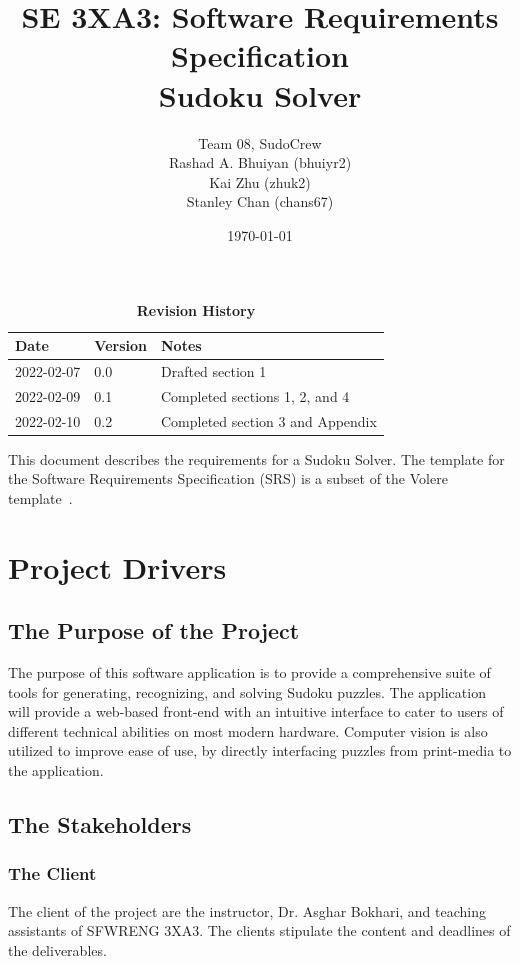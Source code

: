 \documentclass[11pt]{article}
\title{SE 3XA3: Software Requirements Specification\\Sudoku Solver}
\author{Team 08, SudoCrew
		\\ Rashad A. Bhuiyan (bhuiyr2)
		\\ Kai Zhu (zhuk2)
		\\ Stanley Chan (chans67)
}
\date{\today}
\begin{document}
\maketitle

\tableofcontents
\newpage
\listoftables
\listoffigures

\newpage

\begin{table}[H]
\caption{\bf Revision History}
\begin{tabularx}{\textwidth}{p{3cm}p{2cm}X}
\toprule {\bf Date} & {\bf Version} & {\bf Notes}\\
\midrule
2022-02-07 & 0.0 & Drafted section 1\\
2022-02-09 & 0.1 & Completed sections 1, 2, and 4\\
2022-02-10 & 0.2 & Completed section 3 and Appendix\\
\bottomrule
\end{tabularx}
\end{table}

\newpage


This document describes the requirements for a Sudoku Solver.  The template for the Software
Requirements Specification (SRS) is a subset of the Volere
template~\citep{RobertsonAndRobertson2012}.

\section{Project Drivers}

\subsection{The Purpose of the Project}
The purpose of this software application is to provide a comprehensive suite of tools for generating, recognizing, and solving Sudoku puzzles. The application will provide a web-based front-end with an intuitive interface to cater to users of different technical abilities on most modern hardware. Computer vision is also utilized to improve ease of use, by directly interfacing puzzles from print-media to the application.

\subsection{The Stakeholders}
\subsubsection{The Client}
The client of the project are the instructor, Dr. Asghar Bokhari, and teaching assistants of SFWRENG 3XA3. The clients stipulate the content and deadlines of the deliverables.
\end{document}
